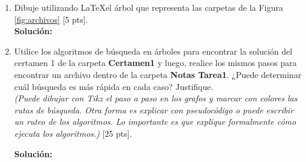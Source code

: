 \documentclass[letterpaper,10pt]{article}
\begin{document}
\begin{enumerate}
\begin{enumerate}
    \item Dibuje utilizando \LaTeX  el árbol que representa las carpetas de la Figura \ref{fig:archivos} [5 pts].\\
    \textbf{Solución:}
    \item Utilice los algoritmos de búsqueda en árboles para encontrar la solución del certamen 1 de la carpeta \textbf{Certamen1} y luego, realice los mismos pasos para encontrar un archivo dentro de la carpeta \textbf{Notas Tarea1}. ¿Puede determinar cuál búsqueda es más rápida en cada caso? Justifique.\\
    \textit{(Puede dibujar con Tikz el paso a paso en los grafos y marcar con colores las rutas de búsqueda. Otra forma es explicar con pseudocódigo o puede escribir un ruteo de los algoritmos. Lo importante es que explique formalmente cómo ejecuta los algoritmos.)} [25 pts].
    
    \textbf{Solución:}
\end{enumerate}


\end{enumerate}
\end{document}
